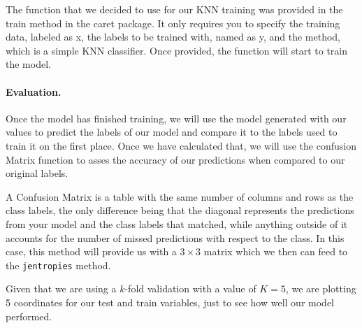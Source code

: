 The function that we decided to use for our KNN training was provided in the train method in the caret package. It only requires you to specify the training data, labeled as x, the labels to be trained with, named as y, and the method, which is a simple KNN classifier. Once provided, the function will start to train the model. \par


\paragraph{Evaluation. } Once the model has finished training, we will use the model generated with our values to predict the labels of our model and compare it to the labels used to train it on the first place. Once we have calculated that, we will use the confusion Matrix function to asses the accuracy of our predictions when compared to our original labels. 

A Confusion Matrix is a table with the same number of columns and rows as the class labels,  the only difference being that the diagonal represents the predictions from your model and the class labels that matched, while anything outside of it accounts for the number of missed predictions with respect to the class. In this case, this method will provide us with a $3\times3$ matrix which we then can feed to the \texttt{jentropies} method. \par
%

 Given that we are using a $k$-fold validation with a value of $K = 5$, we are plotting 5 coordinates for our test and train variables, just to see how well our model performed.\newline


